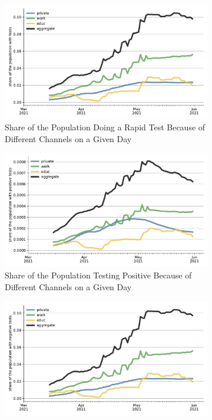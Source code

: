 \begin{figure}[ht] %
  \centering
  \begin{subfigure}[b]{0.3\textwidth}
      \includegraphics[width=\textwidth]{figures/results/figures/rapid_test_statistics/popshare_tested}
      \caption{Share of the Population Doing a Rapid Test Because of Different Channels
      on a Given Day}
      \label{fig:rapid_test_demand_by_channel}
  \end{subfigure}
  \hfill
  \begin{subfigure}[b]{0.3\textwidth}
      \includegraphics[width=\textwidth]{figures/results/figures/rapid_test_statistics/popshare_tested_positive}
      \caption{Share of the Population Testing Positive Because of Different Channels
      on a Given Day}
      \label{fig:pos_rapid_tests_by_channel}
  \end{subfigure}
  \hfill
  \begin{subfigure}[b]{0.3\textwidth}
      \includegraphics[width=\textwidth]{figures/results/figures/rapid_test_statistics/popshare_tested_negative}

\end{subfigure}
\end{figure}
